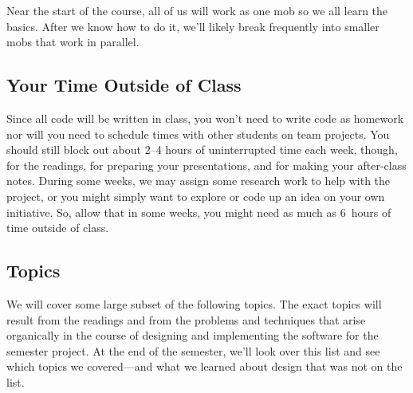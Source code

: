 \documentclass[12pt]{article}
\begin{document}
Near the start of the course, all of us will work as one mob so we all learn
the basics. After we know how to do it, we'll likely break frequently into
smaller mobs that work in parallel.

\subsection*{Your Time Outside of Class}

Since all code will be written in class, you won't need to write code as
homework nor will you need to schedule times with other students on team
projects. You should still block out about 2--4 hours of uninterrupted
time each week, though, for the readings, for preparing your presentations,
and for making your after-class notes. During some weeks, we may assign some
research work to help with the project, or you might simply want to explore or
code up an idea on your own initiative. So, allow that in some weeks, you
might need as much as 6~hours of time outside of class.

\pagebreak
\subsection*{Topics}
We will cover some large subset of the following topics. The exact topics will
result from the readings and from the problems and techniques that arise
organically in the course of designing and implementing the software for the
semester project. At the end of the semester, we'll look over this list and
see which topics we covered---and what we learned about design that was not
on the list.
\end{document}
